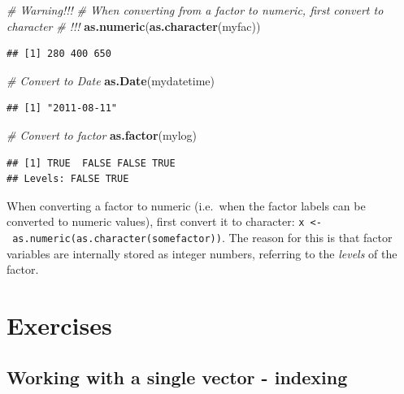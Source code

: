 \documentclass[]{book}
\newenvironment{Shaded}{\begin{snugshade}}{\end{snugshade}}
\newcommand{\CommentTok}[1]{\textcolor[rgb]{0.56,0.35,0.01}{\textit{#1}}}
\newcommand{\KeywordTok}[1]{\textcolor[rgb]{0.13,0.29,0.53}{\textbf{#1}}}
\newcommand{\NormalTok}[1]{#1}
\let\BeginKnitrBlock\begin \let\EndKnitrBlock\end
\begin{document}
\begin{Shaded}
\begin{Highlighting}[]
\CommentTok{# Warning!!!}
\CommentTok{# When converting from a factor to numeric, first convert to character}
\CommentTok{# !!!}
\KeywordTok{as.numeric}\NormalTok{(}\KeywordTok{as.character}\NormalTok{(myfac))}
\end{Highlighting}
\end{Shaded}

\begin{verbatim}
## [1] 280 400 650
\end{verbatim}

\begin{Shaded}
\begin{Highlighting}[]
\CommentTok{# Convert to Date}
\KeywordTok{as.Date}\NormalTok{(mydatetime)}
\end{Highlighting}
\end{Shaded}

\begin{verbatim}
## [1] "2011-08-11"
\end{verbatim}

\begin{Shaded}
\begin{Highlighting}[]
\CommentTok{# Convert to factor}
\KeywordTok{as.factor}\NormalTok{(mylog)}
\end{Highlighting}
\end{Shaded}

\begin{verbatim}
## [1] TRUE  FALSE FALSE TRUE 
## Levels: FALSE TRUE
\end{verbatim}

\BeginKnitrBlock{rmdcaution}
When converting a factor to numeric (i.e.~when the factor labels can be converted to numeric values), first convert it to character: \texttt{x\ \textless{}-\ as.numeric(as.character(somefactor))}. The reason for this is that factor variables are internally stored as integer numbers, referring to the \emph{levels} of the factor.
\EndKnitrBlock{rmdcaution}

\hypertarget{exercises-1}{%
\section{Exercises}\label{exercises-1}}

\hypertarget{working-with-a-single-vector---indexing}{%
\subsection{Working with a single vector - indexing}\label{working-with-a-single-vector---indexing}}
\end{document}
